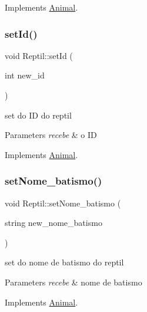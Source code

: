 Implements \mbox{\hyperlink{class_animal}{Animal}}.

\mbox{\label{class_reptil_a43569ac6f03199c92e40b8f907b65d7e}} 
\subsubsection{\texorpdfstring{setId()}{setId()}}
{\footnotesize\ttfamily void Reptil\+::set\+Id (\begin{DoxyParamCaption}\item[{int}]{new\+\_\+id }\end{DoxyParamCaption})\hspace{0.3cm}{\ttfamily [virtual]}}



set do ID do reptil 


\begin{DoxyParams}{Parameters}
{\em recebe} & o ID \\
\hline
\end{DoxyParams}


Implements \mbox{\hyperlink{class_animal}{Animal}}.

\mbox{\label{class_reptil_ac24d7811c52de75790c1522cf20653fb}} 
\subsubsection{\texorpdfstring{setNome\_batismo()}{setNome\_batismo()}}
{\footnotesize\ttfamily void Reptil\+::set\+Nome\+\_\+batismo (\begin{DoxyParamCaption}\item[{string}]{new\+\_\+nome\+\_\+batismo }\end{DoxyParamCaption})\hspace{0.3cm}{\ttfamily [virtual]}}



set do nome de batismo do reptil 


\begin{DoxyParams}{Parameters}
{\em recebe} & nome de batismo \\
\hline
\end{DoxyParams}


Implements \mbox{\hyperlink{class_animal}{Animal}}.

